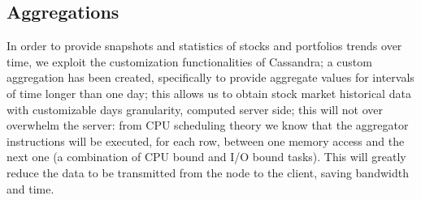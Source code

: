 \subsection{Aggregations}
In order to provide snapshots and statistics of stocks and portfolios trends
over time, we exploit the customization functionalities of Cassandra; a custom
aggregation has been created, specifically to provide aggregate values for
intervals of time longer than one day; this allows us to obtain stock market 
historical data with customizable days granularity, computed server side; this
will not over overwhelm the server: from CPU scheduling theory we know that
the aggregator instructions will be executed, for each row, between one memory
access and the next one (a combination of CPU bound and I/O bound tasks). This
will greatly reduce the data to be transmitted from the node to the client,
saving bandwidth and time.
